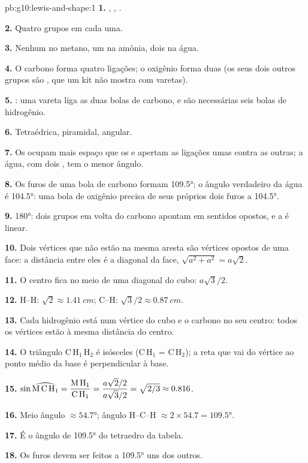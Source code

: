 \begin{solution}{pb:g10:lewis-and-shape:1}
\textbf{1.} , ,
.

\textbf{2.} Quatro grupos em cada uma.

\textbf{3.} Nenhum no metano, um na amônia, dois na água.

\textbf{4.} O carbono forma quatro ligações; o oxigênio forma duas (os
seus dois outros grupos são , que um kit não mostra
com varetas).

\textbf{5.} : uma vareta liga
as duas bolas de carbono, e são necessárias seis bolas de hidrogênio.

\textbf{6.} Tetraédrica, piramidal, angular.

\textbf{7.} Os  ocupam mais espaço que os  e apertam as ligações umas contra as outras; a água, com dois
, tem o menor ângulo.

\textbf{8.} Os furos de uma bola de carbono formam \ang{109.5}; o ângulo
verdadeiro da água é \ang{104.5}: uma bola de oxigênio precisa de seus
próprios dois furos a \ang{104.5}.

\textbf{9.} \ang{180}: dois grupos em volta do carbono apontam em
sentidos opostos, e a  é linear.

\textbf{10.} Dois vértices que não estão na mesma aresta são vértices
opostos de uma face: a distância entre eles é a diagonal da face,
$\sqrt{a^2 + a^2} = a\sqrt{2}$.

\textbf{11.} O centro fica no meio de uma diagonal do cubo:
$a\sqrt{3}/2$.

\textbf{12.} H--H: $\sqrt{2} \approx \qty{1.41}{cm}$; C--H:
$\sqrt{3}/2 \approx \qty{0.87}{cm}$.

\textbf{13.} Cada hidrogênio está num vértice do cubo e o carbono no seu
centro: todos os vértices estão à mesma distância do centro.

\textbf{14.} O triângulo C\,H$_1$\,H$_2$ é isósceles (C\,H$_1$ = C\,H$_2$);
a reta que vai do vértice ao ponto médio da base é perpendicular à base.

\textbf{15.} $\sin \widehat{\text{M\,C\,H}_1} = \dfrac{\text{M\,H}_1}{\text{C\,H}_1}
= \dfrac{a\sqrt{2}/2}{a\sqrt{3}/2} = \sqrt{2/3} \approx 0.816$.

\textbf{16.} Meio ângulo $\approx \ang{54.7}$; ângulo H--C--H $\approx
2 \times 54.7 = \ang{109.5}$.

\textbf{17.} É o ângulo de \ang{109.5} do tetraedro da tabela.

\textbf{18.} Os furos devem ser feitos a \ang{109.5} uns dos outros.
\end{solution}
